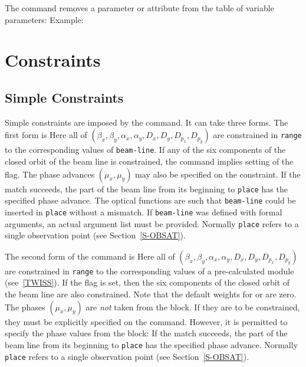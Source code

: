 The command  removes
a parameter or attribute from the table of variable parameters:
Example:
 
\section{Constraints}
\label{S-CONSTR}
\subsection{Simple Constraints}
Simple constraints are imposed by the  command.
It can take three forms. The first form is
Here all of
\((\beta_{x}, \beta_{y}, \alpha_{x}, \alpha_{y},
D_{x}, D_{y}, D_{p_{x}}, D_{p_{y}})\)
are constrained in {\tt range} to the corresponding values
of {\tt beam-line}.
If any of the six components of the closed orbit of the beam line
is constrained, the command implies setting of the  flag.
The phase advances \((\mu_{x},\mu_{y})\) may also be specified on the
constraint.
If the match succeeds,
the part of the beam line from its beginning to {\tt place} has
the specified phase advance.
The optical functions are such that {\tt beam-line}
could be inserted in {\tt place} without a mismatch.
If {\tt beam-line} was defined with formal arguments,
an actual argument list must be provided.
Normally {\tt place} refers to a single observation point
(see Section~\ref{S-OBSAT}).
 
The second form of the  command is
Here all of
\((\beta_{x}, \beta_{y}, \alpha_{x}, \alpha_{y},
D_{x}, D_{y}, D_{p_{x}}, D_{p_{y}})\)
are constrained in {\tt range} to the corresponding values
of a pre-calculated  module (see~\ref{TWISS}).
If the  flag is set, then the six components of the closed
orbit of the beam line are also constrained.
Note that the default weights for  or  are zero.
The phases \((\mu_{x},\mu_{y})\) are {\em not} taken from the 
block.  If they are to be constrained, they must be explicitly
specified on the  command.  However, it is permitted to
specify the phase values from the  block:
If the match succeeds,
the part of the beam line from its beginning to {\tt place} has
the specified phase advance.
Normally {\tt place} refers to a single observation point
(see Section~\ref{S-OBSAT}).
 
